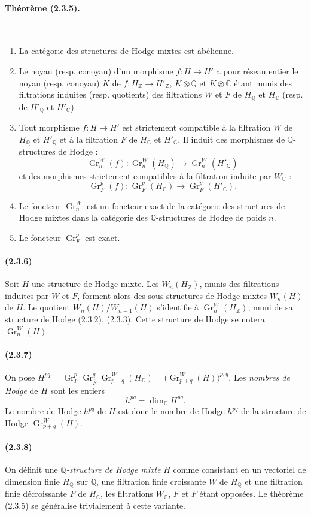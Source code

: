 \documentclass[10pt]{article}
\newcommand{\C}{\mathbb C}
\newcommand{\Q}{\mathbb Q}
\newcommand{\Z}{\mathbb Z}
\newcommand{\Gr}{\operatorname{Gr}}
\begin{document}
\paragraph{Théorème (2.3.5).} --- {\itshape
\begin{enumerate}[label=(\roman*)]
\item La catégorie des structures de Hodge mixtes est abélienne.
\item Le noyau (resp. conoyau) d'un morphisme $f:H\to H'$ a pour réseau entier le noyau (resp. conoyau) $K$ de $f:H_\Z\to H'_\Z$, $K\otimes\Q$ et $K\otimes\C$ étant munis des filtrations induites (resp. quotients) des filtrations $W$ et $F$ de $H_\Q$ et $H_\C$ (resp. de $H'_\Q$ et $H'_\C$).
\item Tout morphisme $f:H\to H'$ est strictement compatible à la filtration $W$ de $H_\Q$ et $H'_\Q$ et à la filtration $F$ de $H_\C$ et $H'_\C$. Il induit des morphismes de $\Q$-structures de Hodge :
\[
\Gr_n^W(f):\Gr_n^W(H_\Q)\longrightarrow\Gr_n^W(H'_\Q)
\]
et des morphismes strictement compatibles à la filtration induite par $W_\C$ :
\[
\Gr_F^p(f):\Gr_F^p(H_\C)\longrightarrow\Gr_F^p(H'_\C).
\]
\item Le foncteur $\Gr_n^W$ est un foncteur exact de la catégorie des structures de Hodge mixtes dans la catégorie des $\Q$-structures de Hodge de poids $n$.
\item Le foncteur $\Gr_F^p$ est exact.
\end{enumerate}}

\paragraph{(2.3.6)} Soit $H$ une structure de Hodge mixte. Les $W_n(H_\Z)$, munis des filtrations induites par $W$ et $F$, forment alors des sous-structures de Hodge mixtes $W_n(H)$ de $H$. Le quotient $W_n(H)/W_{n-1}(H)$ s'identifie à $\Gr_n^W(H_\Z)$, muni de sa structure de Hodge (2.3.2), (2.3.3). Cette structure de Hodge se notera $\Gr_n^W(H)$.

\paragraph{(2.3.7)} On pose $H^{pq}=\Gr_F^p\Gr_{\overline F}^q\Gr_{p+q}^W(H_\C)=\bigl(\Gr_{p+q}^W(H)\bigr)^{p,q}$. Les \emph{nombres de Hodge} de $H$ sont les entiers
\[
h^{pq}=\dim_\C H^{pq}.
\]
Le nombre de Hodge $h^{pq}$ de $H$ est donc le nombre de Hodge $h^{pq}$ de la structure de Hodge $\Gr_{p+q}^W(H)$.

\paragraph{(2.3.8)} On définit une \emph{$\Q$-structure de Hodge mixte} $H$ comme consistant en un vectoriel de dimension finie $H_\Q$ sur $\Q$, une filtration finie croissante $W$ de $H_\Q$ et une filtration finie décroissante $F$ de $H_\C$, les filtrations $W_\C$, $F$ et $\overline F$ étant opposées. Le théorème (2.3.5) se généralise trivialement à cette variante.
\end{document}
